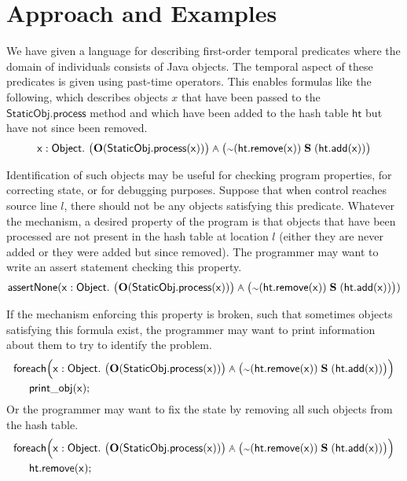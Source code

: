\documentclass{article}
\newcommand{\lang}[1]{\mathsf{#1}}
\newcommand{\ltlO}{\mathbf{O}}
\newcommand{\ltlS}{\mathrel{\mathbf{S}}}
\newcommand{\ltlwedge}{\mathbin{\vcenter{\offinterlineskip\vskip 0.1em\hbox{\hskip 0.2em$\cdot$}\vskip-0.55em\hbox{$\wedge$}}}}
\newcommand{\ltlneg}{\mathord{\hbox{\scriptsize$\sim$}}}
\begin{document}
\section{Approach and Examples}

We have given a language for describing first-order temporal predicates where the domain of individuals consists of Java objects.  The temporal aspect of these predicates is given using past-time operators.  This enables formulas like the following, which describes objects $x$ that have been passed to the $\lang{StaticObj.process}$ method and which have been added to the hash table $\lang{ht}$ but have not since been removed.
\[\lang{x} : \lang{Object}.\ \bigl(\ltlO (\lang{StaticObj.process(x)})\bigr) \ltlwedge
\bigl(\ltlneg (\lang{ht.remove(x)}) \ltlS (\lang{ht.add(x)})\bigr)\]

Identification of such objects may be useful for checking program properties, for correcting state, or for debugging purposes.  Suppose that when control reaches source line $l$, there should not be any objects satisfying this predicate.  Whatever the mechanism, a desired property of the program is that objects that have been processed are not present in the hash table at location $l$ (either they are never added or they were added but since removed).  The programmer may want to write an assert statement checking this property.
\[\lang{assertNone}(\lang{x} : \lang{Object}.\ \bigl(\ltlO (\lang{StaticObj.process(x)})\bigr) \ltlwedge
\bigl(\ltlneg (\lang{ht.remove(x)}) \ltlS (\lang{ht.add(x)})\bigr))\]

If the mechanism enforcing this property is broken, such that sometimes objects satisfying this formula exist, the programmer may want to print information about them to try to identify the problem.
\begin{align*}
&\lang{foreach\Bigl( x : Object} .\  \bigl(\ltlO (\lang{StaticObj.process(x)})\bigr) \ltlwedge
\bigl(\ltlneg (\lang{ht.remove(x)}) \ltlS (\lang{ht.add(x)})\bigr) \Bigr)\\
& \ind \lang{print\_obj(x);}
\end{align*}
Or the programmer may want to fix the state by removing all such objects from the hash table.
\begin{align*}
&\lang{foreach\Bigl( x : Object} .\  \bigl(\ltlO (\lang{StaticObj.process(x)})\bigr) \ltlwedge
\bigl(\ltlneg (\lang{ht.remove(x)}) \ltlS (\lang{ht.add(x)})\bigr) \Bigr)\\
& \ind \lang{ht.remove(x);}
\end{align*}
\end{document}
